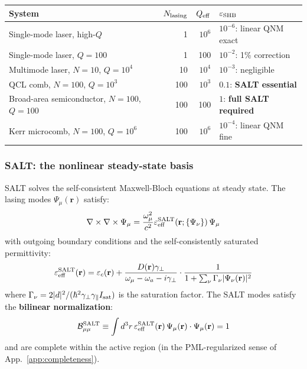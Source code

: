 \documentclass[12pt]{article}
\begin{document}
\begin{center}
\begin{tabular}{lrrl}
\toprule
System & $N_{\rm lasing}$ & $Q_{\rm eff}$ &
$\varepsilon_{\rm SHB}$ \\
\midrule
Single-mode laser, high-$Q$ & 1 & $10^6$ & $10^{-6}$: linear QNM exact \\
Single-mode laser, $Q=100$ & 1 & 100 & $10^{-2}$: 1\% correction \\
Multimode laser, $N=10$, $Q=10^4$ & 10 & $10^4$ & $10^{-3}$: negligible \\
QCL comb, $N=100$, $Q=10^3$ & 100 & $10^3$ &
  $0.1$: \textbf{SALT essential} \\
Broad-area semiconductor, $N=100$, $Q=100$ & 100 & 100 &
  $1$: \textbf{full SALT required} \\
Kerr microcomb, $N=100$, $Q=10^6$ & 100 & $10^6$ &
  $10^{-4}$: linear QNM fine \\
\bottomrule
\end{tabular}
\end{center}

\subsubsection*{SALT: the nonlinear steady-state basis}

SALT \cite{Tureci2006,Ge2010} solves the self-consistent Maxwell-Bloch
equations at steady state.  The lasing modes $\Psi_\mu(\mathbf{r})$ satisfy:
\begin{equation}
  \nabla\times\nabla\times\Psi_\mu =
  \frac{\omega_\mu^2}{c^2}\varepsilon_{\rm eff}^{\rm SALT}(\mathbf{r};\{\Psi_\nu\})
  \,\Psi_\mu
  \label{eq:SALT_eigen}
\end{equation}
with outgoing boundary conditions and the self-consistently saturated
permittivity:
\begin{equation}
  \varepsilon_{\rm eff}^{\rm SALT}(\mathbf{r}) =
  \varepsilon_c(\mathbf{r}) +
  \frac{D(\mathbf{r})\gamma_\perp}{\omega_\mu - \omega_a - i\gamma_\perp}
  \cdot\frac{1}{1+\sum_\nu\Gamma_\nu|\Psi_\nu(\mathbf{r})|^2}
  \label{eq:SALT_eps}
\end{equation}
where $\Gamma_\nu = 2|d|^2/(\hbar^2\gamma_\perp\gamma_\parallel I_{\rm sat})$
is the saturation factor.  The SALT modes satisfy the \textbf{bilinear
normalization}:
\begin{equation}
  \mathcal{B}_{\mu\mu}^{\rm SALT} \equiv
  \int d^3r\,\varepsilon_{\rm eff}^{\rm SALT}(\mathbf{r})\,
  \Psi_\mu(\mathbf{r})\cdot\Psi_\mu(\mathbf{r}) = 1
  \label{eq:SALT_bilinear_norm}
\end{equation}
and are complete within the active region (in the PML-regularized sense
of App.~\ref{app:completeness}).
\end{document}

